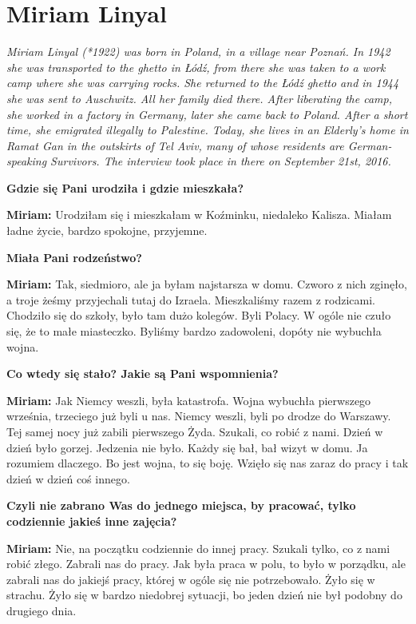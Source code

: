 \section{Miriam Linyal}

\textit{Miriam Linyal (*1922) was born in Poland, in a village near Poznań. In 1942 she was transported to the ghetto in Łódź, from there she was taken to a work camp where she was carrying rocks. She returned to the Łódź ghetto and in 1944 she was sent to Auschwitz. All her family died there. After liberating the camp, she worked in a factory in Germany, later she came back to Poland. After a short time, she emigrated illegally to Palestine. Today, she lives in an Elderly’s home in Ramat Gan in the outskirts of Tel Aviv, many of whose residents are German-speaking Survivors. The interview took place in there on September 21st, 2016.}\par
\vspace*{2em}
\textbf{Gdzie się Pani urodziła i gdzie mieszkała?} 

\textbf{Miriam:} Urodziłam się i mieszkałam w Koźminku, niedaleko Kalisza. Miałam ładne życie, bardzo spokojne, przyjemne.

\textbf{Miała Pani rodzeństwo?} 

\textbf{Miriam:} Tak, siedmioro, ale ja byłam najstarsza w domu. Czworo z nich zginęło, a troje żeśmy przyjechali tutaj do Izraela. Mieszkaliśmy razem z rodzicami. Chodziło się do szkoły, było tam dużo kolegów. Byli Polacy. W ogóle nie czuło się, że to małe miasteczko. Byliśmy bardzo zadowoleni, dopóty nie wybuchła wojna.

\textbf{ Co wtedy się stało? Jakie są Pani wspomnienia?} 

\textbf{Miriam:} Jak Niemcy weszli, była katastrofa. Wojna wybuchła pierwszego września, trzeciego już byli u nas. Niemcy weszli, byli po drodze do Warszawy. Tej samej nocy już zabili pierwszego Żyda. Szukali, co robić z nami. Dzień w dzień było gorzej. Jedzenia nie było. Każdy się bał, bał wizyt w domu. Ja rozumiem dlaczego. Bo jest wojna, to się boję. Wzięło się nas zaraz do pracy i tak dzień w dzień coś innego.

\textbf{Czyli nie zabrano Was do jednego miejsca, by pracować, tylko codziennie jakieś inne zajęcia?} 

\textbf{Miriam:} Nie, na początku codziennie do innej pracy. Szukali tylko, co z nami robić złego. Zabrali nas do pracy. Jak była praca w polu, to było w porządku, ale zabrali nas do jakiejś pracy, której w ogóle się nie potrzebowało. Żyło się w strachu. Żyło się w bardzo niedobrej sytuacji, bo jeden dzień nie był podobny do drugiego dnia. 

